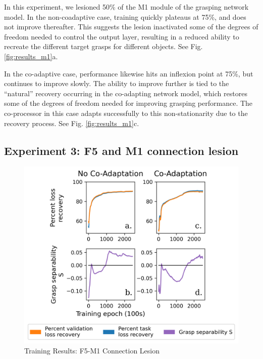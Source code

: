 \documentclass[12pt]{iopart}
\begin{document}
In this experiment, we lesioned 50\% of the M1 module of the grasping network model. 
In the non-coadaptive case, training quickly plateaus at 75\%, and does not improve
thereafter. This suggests the lesion inactivated some of the degrees of freedom needed to
control the output layer, resulting in a reduced ability to recreate the different target grasps
for different objects. See Fig. \ref{fig:results_m1}a.


In the co-adaptive case, performance likewise hits an inflexion point at 75\%, but
continues to improve slowly. The ability to improve further is tied to the
``natural'' recovery occurring in the co-adapting network model, which restores some of the
degrees of freedom needed for improving grasping performance. The co-processor in this case adapts
successfully to this non-stationarity due to the recovery process. See Fig. \ref{fig:results_m1}c.

\subsection{Experiment 3: F5 and M1 connection lesion}
\label{sec:results_con}

\begin{figure}[h]
\centering
\includegraphics[scale=1]{training_results_con.png}
\caption{Training Results: F5-M1 Connection Lesion}
\label{fig:results_con}
\end{figure}
\end{document}
